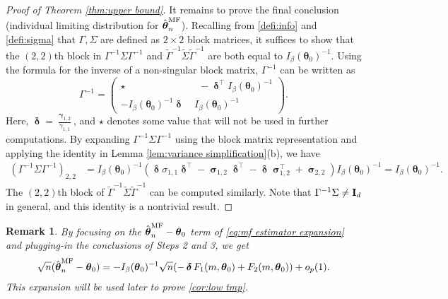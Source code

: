\documentclass[preprint,reqno]{imsart}
\newtheorem{remark}{Remark}[section]
\newcommand{\ttheta}{\boldsymbol{\theta}}
\newcommand{\I}{\mathbf{I}_{\mathnormal{d}}}
\DeclareMathOperator{\ggamma}{\boldsymbol{\gamma}}
\DeclareMathOperator{\ssigma}{\boldsymbol{\sigma}}
\DeclareMathOperator{\ddelta}{\boldsymbol{\delta}}
\newcommand{\thetamf}{\hat{\boldsymbol \theta}^{\text{MF}}_{\mathnormal n}}
\begin{document}
\begin{appendix}
\begin{proof}[Proof of Theorem \ref{thm:upper bound}]
    \vspace{2mm}
    It remains to prove the final conclusion (individual limiting distribution for $\thetamf$). Recalling from \cref{defi:info} and \cref{defi:sigma} that $\Gamma,\Sigma$ are defined as $2 \times 2$ block matrices, it suffices to show that the $(2,2)$th block in $\Gamma^{-1} \Sigma \Gamma^{-1}$ and $\tilde{\Gamma}^{-1} \tilde{\Sigma} \tilde{\Gamma}^{-1}$ are both equal to $I_{\beta}(\ttheta_0)^{-1}$. Using the formula for the inverse of a non-singular block matrix, $\Gamma^{-1}$ can be written as
    $$\Gamma^{-1} = \begin{pmatrix}
        \star &~~~ -\ddelta^{\top} I_\beta(\ttheta_0)^{-1}  \\
        - I_\beta(\ttheta_0)^{-1} \ddelta &~ I_\beta(\ttheta_0)^{-1}
    \end{pmatrix}.$$
    Here, $\ddelta = \frac{\ggamma_{1,2}}{\gamma_{1,1}}$, and $\star$ denotes some value that will not be used in further computations. 
    By expanding $\Gamma^{-1} \Sigma \Gamma^{-1}$ using the block matrix representation and applying the identity in Lemma \ref{lem:variance simplification}(b), we have
    \begin{align*}
        (\Gamma^{-1} \Sigma \Gamma^{-1})_{2,2} &= I_\beta(\ttheta_0)^{-1} \left(\ddelta \sigma_{1,1} \ddelta^{\top} - \ssigma_{1,2} \ddelta^{\top} - \ddelta \ssigma_{1,2}^{\top} + \ssigma_{2,2} \right)  I_\beta(\ttheta_0)^{-1} =  I_\beta(\ttheta_0)^{-1}.
    \end{align*}
    The $(2,2)$th block of $\tilde{\Gamma}^{-1} \tilde{\Sigma} \tilde{\Gamma}^{-1}$ can be computed similarly.
    Note that $\Gamma^{-1} \Sigma \neq \I$ in general, and this identity is a nontrivial result.
\end{proof}

\begin{remark}
    By focusing on the $\thetamf - \ttheta_0$ term of \eqref{eq:mf estimator expansion} and plugging-in the conclusions of Steps 2 and 3, we get
    \begin{align}\label{eq:upper bound expansion low tmp}
        \sqrt{n}(\thetamf - \ttheta_0) = - I_\beta(\ttheta_0)^{-1} {\sqrt{n} (- \ddelta F_1(m, \ttheta_0) + F_2(m, \ttheta_0))} + o_p(1).
    \end{align}
    This expansion will be used later to prove \cref{cor:low tmp}.
\end{remark}




%

%
%
%
%
%
    

\end{appendix}
\end{document}
